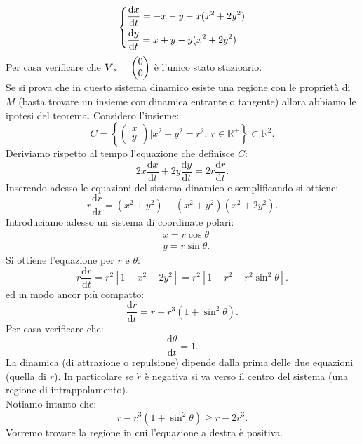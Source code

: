 \begin{ex}
    \[
    \begin{dcases}
	\frac{\text{d} x}{\text{d} t} = -x -y -x(x^2+2y^2) \\
	\frac{\text{d} y}{\text{d} t} = x + y - y (x^2 + 2y^2) 
    \end{dcases}
    \]
    Per casa verificare che $\boldsymbol{V}_s = \begin{pmatrix} 0 \\ 0 \end{pmatrix}$ è l'unico stato stazioario.\\
    Se si prova che in questo sistema dinamico esiste una regione con le proprietà di $M$ (basta trovare un insieme con dinamica entrante o tangente) allora abbiamo le ipotesi del teorema.
    Considero l'insieme:
    \[
        C = \left\{\begin{pmatrix} x \\ y \end{pmatrix}| x^2 + y^2 = r^2, \ r \in \mathbb{R}^+\right\} \subset \mathbb{R}^2
    .\] 
    Deriviamo rispetto al tempo l'equazione che definisce $C$:
    \[
        2x\frac{\text{d} x}{\text{d} t} + 2y\frac{\text{d} y}{\text{d} t} = 2r\frac{\text{d} r}{\text{d} t} 
    .\] 
    Inserendo adesso le equazioni del sistema dinamico e semplificando si ottiene:
    \[
	r\frac{\text{d} r}{\text{d} t} = (x^2+y^2) -(x^2+y^2) (x^2+2y^2) 
    .\] 
    Introduciamo adesso un sistema di coordinate polari:
    \[\begin{aligned}
	& x = r\cos\theta\\
	& y = r\sin\theta
    .\end{aligned}\]
    Si ottiene l'equazione per $r$ e $\theta$:
    \[
        r\frac{\text{d} r}{\text{d} t} = r^2\left[1-x^2-2y^2\right]= r^2\left[1-r^2-r^2\sin^2\theta\right]
    .\] 
    ed in modo ancor più compatto:
    \[
	\frac{\text{d} r}{\text{d} t} = r-r^3(1+\sin^2\theta) 
    .\] 
    Per casa verificare che:
    \[
        \frac{\text{d} \theta}{\text{d} t} = 1
    .\] 
    La dinamica (di attrazione o repulsione) dipende dalla prima delle due equazioni (quella di $r$). In particolare se $\dot{r}$ è negativa si va verso il centro del sistema (una regione di intrappolamento).\\
    Notiamo intanto che:
    \[
	r-r^3(1+\sin^2\theta) \ge r-2r^3 
    .\] 
    Vorremo trovare la regione in cui l'equazione a destra è positiva.

\end{ex}
